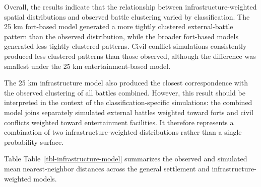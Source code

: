 \documentclass[
  letterpaper,
  DIV=11,
  numbers=noendperiod]{scrartcl}
\begin{document}
Overall, the results indicate that the relationship between
infrastructure-weighted spatial distributions and observed battle
clustering varied by classification. The 25 km fort-based model
generated a more tightly clustered external-battle pattern than the
observed distribution, while the broader fort-based models generated
less tightly clustered patterns. Civil-conflict simulations consistently
produced less clustered patterns than those observed, although the
difference was smallest under the 25 km entertainment-based model.

The 25 km infrastructure model also produced the closest correspondence
with the observed clustering of all battles combined. However, this
result should be interpreted in the context of the
classification-specific simulations: the combined model joins separately
simulated external battles weighted toward forts and civil conflicts
weighted toward entertainment facilities. It therefore represents a
combination of two infrastructure-weighted distributions rather than a
single probability surface.

Table Table~\ref{tbl-infrastructure-model} summarizes the observed and
simulated mean nearest-neighbor distances across the general settlement
and infrastructure-weighted models.
\end{document}
